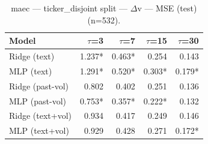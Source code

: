 \begin{table}[t]
\centering
\begin{tabular}{lrrrr}
\toprule
Model & $\tau$=3 & $\tau$=7 & $\tau$=15 & $\tau$=30 \\
\midrule
Ridge (text) & 1.237* & 0.463* & 0.254 & 0.143 \\
MLP (text) & 1.291* & 0.520* & 0.303* & 0.179* \\
Ridge (past-vol) & 0.802 & 0.402 & 0.251 & 0.136 \\
MLP (past-vol) & 0.753* & 0.357* & 0.222* & 0.132 \\
Ridge (text+vol) & 0.934 & 0.417 & 0.249 & 0.146 \\
MLP (text+vol) & 0.929 & 0.428 & 0.271 & 0.172* \\
\bottomrule
\end{tabular}
\caption{maec — ticker\_disjoint split — $\Delta$v — MSE (test) (n=532).}
\end{table}
